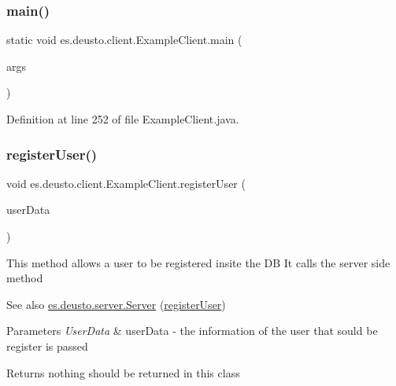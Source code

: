 \subsubsection{\texorpdfstring{main()}{main()}}
{\footnotesize\ttfamily static void es.\+deusto.\+client.\+Example\+Client.\+main (\begin{DoxyParamCaption}\item[{String \mbox{[}$\,$\mbox{]}}]{args }\end{DoxyParamCaption})\hspace{0.3cm}{\ttfamily [static]}}



Definition at line 252 of file Example\+Client.\+java.

\mbox{\label{classes_1_1deusto_1_1client_1_1_example_client_a1c17371c17dde2b7664f2ad17ee79e4b}} 
\subsubsection{\texorpdfstring{register\+User()}{registerUser()}}
{\footnotesize\ttfamily void es.\+deusto.\+client.\+Example\+Client.\+register\+User (\begin{DoxyParamCaption}\item[{\hyperlink{classes_1_1deusto_1_1serialization_1_1_user_data}{User\+Data}}]{user\+Data }\end{DoxyParamCaption})}

This method allows a user to be registered insite the DB It calls the server side method \begin{DoxySeeAlso}{See also}
\hyperlink{classes_1_1deusto_1_1server_1_1_server}{es.\+deusto.\+server.\+Server} (\hyperlink{classes_1_1deusto_1_1client_1_1_example_client_a1c17371c17dde2b7664f2ad17ee79e4b}{register\+User}) 
\end{DoxySeeAlso}

\begin{DoxyParams}{Parameters}
{\em User\+Data} & user\+Data -\/ the information of the user that sould be register is passed \\
\hline
\end{DoxyParams}
\begin{DoxyReturn}{Returns}
nothing should be returned in this class 
\end{DoxyReturn}


